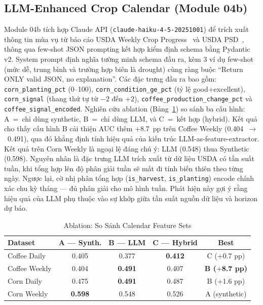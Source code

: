 \documentclass[conference]{IEEEtran}
\begin{document}
\subsection{LLM-Enhanced Crop Calendar (Module 04b)}
Module 04b tích hợp Claude API (\texttt{claude-haiku-4-5-20251001}) để trích
xuất thông tin mùa vụ từ báo cáo USDA Weekly Crop Progress~\cite{usda_nass}
và USDA PSD~\cite{usda_fas}, thông qua few-shot JSON prompting kết hợp kiểm
định schema bằng Pydantic v2. System prompt định nghĩa tường minh schema đầu
ra, kèm 3 ví dụ few-shot (mức dễ, trung bình và trường hợp biên là drought)
cùng ràng buộc ``Return ONLY valid JSON, no explanation''.
Các đặc trưng đầu ra bao gồm: \texttt{corn\_planting\_pct} (0--100),
\texttt{corn\_condition\_ge\_pct} (tỷ lệ good+excellent),
\texttt{corn\_signal} (thang thứ tự từ $-2$ đến $+2$),
\texttt{coffee\_production\_change\_pct} và \texttt{coffee\_signal\_encoded}.
Nghiên cứu ablation (Bảng~\ref{tab:llm_ablation}) so sánh ba cấu hình:
A~=~chỉ dùng synthetic, B~=~chỉ dùng LLM, và C~=~kết hợp (hybrid). Kết quả cho
thấy cấu hình B cải thiện AUC thêm $+$8.7~pp trên Coffee Weekly
(0.404~$\to$~0.491), qua đó khẳng định tính hiệu quả của kiến trúc
LLM-as-feature-extractor.
Kết quả trên Corn Weekly là ngoại lệ đáng chú ý: LLM (0.548) thua Synthetic
(0.598). Nguyên nhân là đặc trưng LLM trích xuất từ dữ liệu USDA có tần suất
tuần, khi tổng hợp lên độ phân giải tuần sẽ mất đi tính biến thiên theo
từng ngày. Ngược lại, cờ nhị phân tổng hợp (\texttt{is\_harvest},
\texttt{is\_planting}) encode chính xác chu kỳ tháng --- đủ phân giải cho
mô hình tuần. Phát hiện này gợi ý rằng hiệu quả của LLM phụ thuộc vào sự
khớp giữa tần suất nguồn dữ liệu và horizon dự báo.
\begin{table}[t]
\caption{Ablation: So Sánh Calendar Feature Sets}
\label{tab:llm_ablation}
\centering
\begin{tabular}{@{}lcccc@{}}
\toprule
\textbf{Dataset} & \textbf{A — Synth.} & \textbf{B — LLM} & \textbf{C — Hybrid} & \textbf{Best} \\
\midrule
Coffee Daily  & 0.405 & 0.377 & \textbf{0.412} & C ($+$0.7 pp) \\
Coffee Weekly & 0.404 & \textbf{0.491} & 0.407 & \textbf{B ($+$8.7 pp)} \\
Corn Daily    & 0.475 & \textbf{0.491} & 0.487 & B ($+$1.6 pp) \\
Corn Weekly   & \textbf{0.598} & 0.548 & 0.526 & A (synthetic) \\
\bottomrule
\end{tabular}
\end{table}
\end{document}
